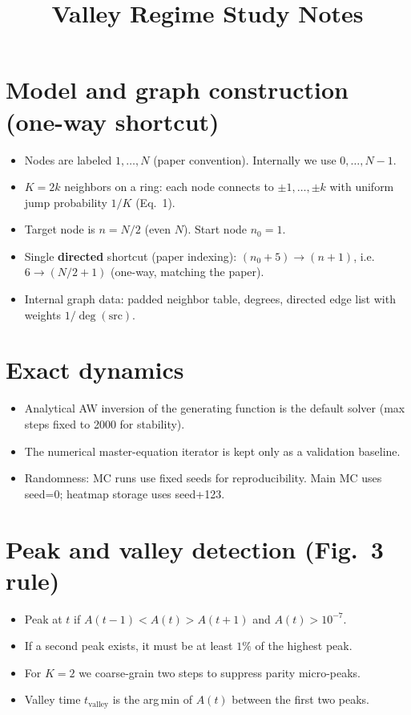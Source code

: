 \documentclass[11pt]{article}
\title{Valley Regime Study Notes}
\author{}
\date{}
\begin{document}
\sloppy
\maketitle

\section{Model and graph construction (one-way shortcut)}
\begin{itemize}
  \item Nodes are labeled $1,\dots,N$ (paper convention). Internally we use $0,\dots,N-1$.
  \item $K=2k$ neighbors on a ring: each node connects to $\pm 1,\dots,\pm k$ with uniform jump probability $1/K$ (Eq.~1).
  \item Target node is $n=N/2$ (even $N$). Start node $n_0=1$.
  \item Single \textbf{directed} shortcut (paper indexing): $(n_0+5)\to (n+1)$, i.e. $6 \to (N/2+1)$ (one-way, matching the paper).
  \item Internal graph data: padded neighbor table, degrees, directed edge list with weights $1/\deg(\mathrm{src})$.
\end{itemize}

\section{Exact dynamics}
\begin{itemize}
  \item Analytical AW inversion of the generating function is the default solver (max steps fixed to 2000 for stability).
  \item The numerical master-equation iterator is kept only as a validation baseline.
  \item Randomness: MC runs use fixed seeds for reproducibility. Main MC uses seed=0; heatmap storage uses seed+123.
\end{itemize}

\section{Peak and valley detection (Fig.~3 rule)}
\begin{itemize}
  \item Peak at $t$ if $A(t\!-\!1)<A(t)>A(t\!+\!1)$ and $A(t)>10^{-7}$.
  \item If a second peak exists, it must be at least $1\%$ of the highest peak.
  \item For $K=2$ we coarse-grain two steps to suppress parity micro-peaks.
  \item Valley time $t_{\mathrm{valley}}$ is the arg\,min of $A(t)$ between the first two peaks.
\end{itemize}
\end{document}
